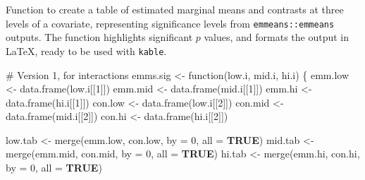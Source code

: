\documentclass[
  bookmarksnumbered]{article}
\newenvironment{Shaded}{\begin{snugshade}}{\end{snugshade}}
\newcommand{\AttributeTok}[1]{\textcolor[rgb]{0.80,0.80,0.80}{#1}}
\newcommand{\CommentTok}[1]{\textcolor[rgb]{0.50,0.62,0.50}{#1}}
\newcommand{\ConstantTok}[1]{\textcolor[rgb]{0.86,0.64,0.64}{\textbf{#1}}}
\newcommand{\ControlFlowTok}[1]{\textcolor[rgb]{0.94,0.87,0.69}{#1}}
\newcommand{\DecValTok}[1]{\textcolor[rgb]{0.86,0.86,0.80}{#1}}
\newcommand{\FunctionTok}[1]{\textcolor[rgb]{0.94,0.94,0.56}{#1}}
\newcommand{\NormalTok}[1]{\textcolor[rgb]{0.80,0.80,0.80}{#1}}
\newcommand{\OtherTok}[1]{\textcolor[rgb]{0.94,0.94,0.56}{#1}}
\begin{document}
Function to create a table of estimated marginal means and contrasts at three levels of a covariate, representing significance levels from \texttt{emmeans::emmeans} outputs. The function highlights significant \(p\) values, and formats the output in \LaTeX, ready to be used with \texttt{kable}.

\begin{Shaded}
\begin{Highlighting}[]
\CommentTok{\# Version 1, for interactions}
\NormalTok{emms.sig }\OtherTok{\textless{}{-}} \ControlFlowTok{function}\NormalTok{(low.i, mid.i, hi.i) \{}
\NormalTok{  emm.low }\OtherTok{\textless{}{-}} \FunctionTok{data.frame}\NormalTok{(low.i[[}\DecValTok{1}\NormalTok{]])}
\NormalTok{  emm.mid }\OtherTok{\textless{}{-}} \FunctionTok{data.frame}\NormalTok{(mid.i[[}\DecValTok{1}\NormalTok{]])}
\NormalTok{  emm.hi }\OtherTok{\textless{}{-}} \FunctionTok{data.frame}\NormalTok{(hi.i[[}\DecValTok{1}\NormalTok{]])}
\NormalTok{  con.low }\OtherTok{\textless{}{-}} \FunctionTok{data.frame}\NormalTok{(low.i[[}\DecValTok{2}\NormalTok{]])}
\NormalTok{  con.mid }\OtherTok{\textless{}{-}} \FunctionTok{data.frame}\NormalTok{(mid.i[[}\DecValTok{2}\NormalTok{]])}
\NormalTok{  con.hi }\OtherTok{\textless{}{-}} \FunctionTok{data.frame}\NormalTok{(hi.i[[}\DecValTok{2}\NormalTok{]]) }
  
\NormalTok{  low.tab }\OtherTok{\textless{}{-}} \FunctionTok{merge}\NormalTok{(emm.low, con.low, }\AttributeTok{by =} \DecValTok{0}\NormalTok{, }\AttributeTok{all =} \ConstantTok{TRUE}\NormalTok{)}
\NormalTok{  mid.tab }\OtherTok{\textless{}{-}} \FunctionTok{merge}\NormalTok{(emm.mid, con.mid, }\AttributeTok{by =} \DecValTok{0}\NormalTok{, }\AttributeTok{all =} \ConstantTok{TRUE}\NormalTok{)}
\NormalTok{  hi.tab }\OtherTok{\textless{}{-}} \FunctionTok{merge}\NormalTok{(emm.hi, con.hi, }\AttributeTok{by =} \DecValTok{0}\NormalTok{, }\AttributeTok{all =} \ConstantTok{TRUE}\NormalTok{)}
  

\end{Highlighting}
\end{Shaded}
\end{document}
